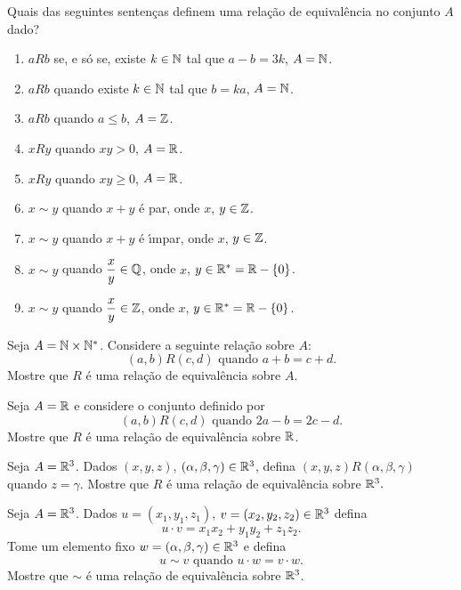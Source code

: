 \documentclass[12pt]{exam}
\begin{document}
\questao Quais das seguintes senten{\c c}as definem uma rela{\c c}{\~a}o de equival{\^e}ncia no conjunto $A$ dado?
\begin{enumerate}[label={\alph*})]
    \item $aRb$ se, e s{\'o} se, existe $k \in \mathbb{N}$ tal que $a - b = 3k$, $A = \mathbb{N}$.
    \item $aRb$ quando existe $k \in \mathbb{N}$ tal que $b = k a$, $A = \mathbb{N}$.
    \item $aRb$ quando $a \le b$, $A = \mathbb{Z}$.
    \item $xRy$ quando $xy > 0$, $ A = \mathbb{R}$.
    \item $xRy$ quando $xy \ge 0$, $ A = \mathbb{R}$.
    \item $x \sim y$ quando $x + y$ \'e par, onde $x$, $y \in \mathbb{Z}$.
    \item $x \sim y$ quando $x + y$ \'e {\'\i}mpar, onde $x$, $y \in \mathbb{Z}$.
    \item $x \sim y$ quando $\dfrac{x}{y} \in \mathbb{Q}$, onde $x$, $y \in \mathbb{R}^* = \mathbb{R} - \{0\}$.
    \item $x \sim y$ quando $\dfrac{x}{y} \in \mathbb{Z}$, onde $x$, $y \in \mathbb{R}^* = \mathbb{R} - \{0\}$.
\end{enumerate}

\vspace{.3cm}


\questao Seja $A = \mathbb{N} \times \mathbb{N}^*$. Considere a seguinte
rela{\c c}{\~a}o sobre $A$:
\[
    (a,b) R (c,d) \mbox{ quando } a + b = c + d.
\]
Mostre que $R$ {\'e} uma rela{\c c}{\~a}o de equival{\^e}ncia sobre $A$.

\vspace{.3cm}

\questao Seja $A = \mathbb{R}$ e considere o conjunto definido por
\[
  (a,b)R(c,d) \mbox{ quando } 2a - b = 2c - d.
\]
Mostre que $R$ \'e uma rela\c{c}\~ao de equival\^encia sobre $\mathbb{R}$.

\vspace{.3cm}

\questao Seja $A = \mathbb{R}^3$. Dados $(x, y, z)$, $(\alpha, \beta, \gamma) \in \mathbb{R}^3$, defina $(x, y, z) R (\alpha, \beta, \gamma)$ quando $z = \gamma$. Mostre que $R$ \'e uma rela\c{c}\~ao de equival\^encia sobre $\mathbb{R}^3.$

\vspace{.3cm}

\questao Seja $A = \mathbb{R}^3$. Dados $u = (x_1, y_1, z_1)$, $v = (x_2, y_2, z_2) \in \mathbb{R}^3$ defina
\[
    u\cdot v = x_1x_2 + y_1y_2 + z_1z_2.
\]
Tome um elemento fixo $w = (\alpha, \beta, \gamma) \in \mathbb{R}^3$ e defina
\[
    u \sim v \mbox{ quando } u \cdot w = v \cdot w.
\]
Mostre que $\sim$ \'e uma rela\c{c}\~ao de equival\^encia sobre $\mathbb{R}^3$.
\end{document}
